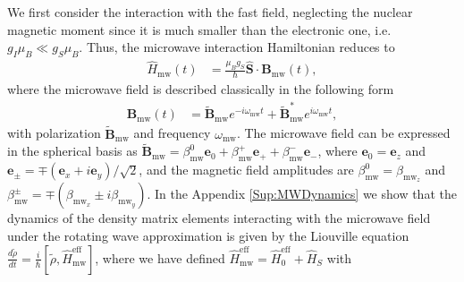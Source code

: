 \documentclass[%
reprint,
 amsmath,amssymb,
 aps,
floatfix,
]{revtex4-1}
\newcommand{\HM}[2][blue]{\textcolor{#1}{ #2}}
\begin{document}
We first consider the interaction with the fast field, neglecting the nuclear magnetic moment since it is much smaller than the electronic one, i.e.\ $g_I\mu_B\ll g_S\mu_B$. Thus, the microwave interaction Hamiltonian reduces to
\begin{align}
\hat{H}_{\mathrm{mw}}(t)&=\frac{\mu_Bg_S}{\hbar}\hat{\mathbf{S}}\cdot \mathbf{B}_{\mathrm{mw}}(t),
\end{align}
where the microwave field is described classically in the following form 
\begin{align}
\mathbf{B}_{\mathrm{mw}}(t)&=\tilde{\mathbf{B}}_{\mathrm{mw}}e^{-i\omega_{\mathrm{mw}}t}+\tilde{\mathbf{B}}_{\mathrm{mw}}^*e^{i\omega_{\mathrm{mw}}t},
\end{align}
with polarization $\tilde{\mathbf{B}}_{\mathrm{mw}}$ and frequency $\omega_{\mathrm{mw}}$.
The microwave field can be expressed in the spherical basis as $
\tilde{\mathbf{B}}_{\mathrm{mw}}=\beta_{\mathrm{mw}}^0 \mathbf{e}_0 + \beta_{\mathrm{mw}}^+\mathbf{e}_+  +\beta_{\mathrm{mw}}^-\mathbf{e}_-$,
where $\mathbf{e}_0=\mathbf{e}_z$ and $\mathbf{e}_\pm=\mp(\mathbf{e}_x+i\mathbf{e}_y)/\sqrt{2}$, and the magnetic field amplitudes are $\beta_{\mathrm{mw}}^0=\beta_{\mathrm{mw}_z}$ and 
 $\beta_{\mathrm{mw}}^\pm=\mp(\beta_{\mathrm{mw}_x}\pm i\beta_{\mathrm{mw}_y})$.
In the 
Appendix \ref{Sup:MWDynamics}
we show that the dynamics of the density matrix elements interacting with the microwave field under the rotating wave approximation is given by the Liouville equation $\frac{d\tilde{\rho} }{dt}=\frac{i}{\hbar}[\tilde{\rho},\hat{H}_{\mathrm{mw}}^{\mathrm{eff}}]$, where we have defined $\hat{H}_{\mathrm{mw}}^{\mathrm{eff}}=\hat{H}_{0}^{\mathrm{eff}}+\hat{H}_{S}$ with
\end{document}
